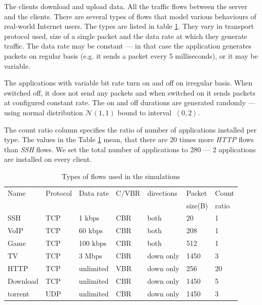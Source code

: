 The clients download and upload data. All the traffic flows between the server and the clients. There are several types of flows that model various behaviours of real-world Internet users. The types are listed in table \ref{tab:traffic}. They vary in transport protocol used, size of a single packet and the data rate at which they generate traffic. The data rate may be constant --- in that case the application generates packets on regular basis (e.g. it sends a packet every 5 milliseconds), or it may be variable.

The applications with variable bit rate turn on and off on irregular basis. When switched off, it does not send any packets and when switched on it sends packets at configured constant rate. The on and off durations are generated randomly --- using normal distribution $\mathcal{N}(1,1)$ bound to interval~$\left\langle0,2\right\rangle$.

The count ratio column specifies the ratio of number of applications installed per type. The values in the Table \ref{tab:traffic} mean, that there are 20 times more \emph{HTTP} flows than \emph{SSH} flows. We set the total number of applications to 280 --- 2 applications are installed on every client. 

\begin{table}
	\centering
	
	\begin{tabular}{@{}lllllll@{}}
		\toprule
		Name     & Protocol & Data rate & C/VBR & directions & Packet  & Count \\
		         &          &           &       &            & size(B) & ratio \\ \midrule
		SSH      & TCP      & 1 kbps    & CBR   & both       & 20      & 1     \\
		VoIP     & TCP      & 60 kbps   & CBR   & both       & 208     & 1     \\
		Game     & TCP      & 100 kbps  & CBR   & both       & 512     & 1     \\
		TV       & TCP      & 3 Mbps    & CBR   & down only  & 1450    & 3     \\
		HTTP     & TCP      & unlimited & VBR   & down only  & 256     & 20    \\
		Download & TCP      & unlimited & CBR   & down only  & 1450    & 5     \\
		torrent  & UDP      & unlimited & CBR   & down only  & 1450    & 3     \\ \bottomrule
	\end{tabular}
	\caption{Types of flows used in the simulations}
	\label{tab:traffic}
\end{table}


